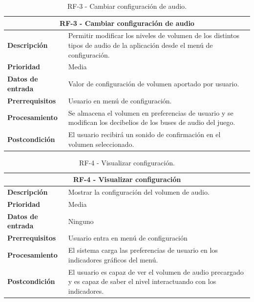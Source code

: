 \begin{table}[H]
	\centering
	\caption{RF-3 - Cambiar configuración de audio.}
	\label{table:RF3}
	\begin{tabular}{|l|p{10cm}|}
		\hline
		\multicolumn{2}{|c|}{\textbf{RF-3 - Cambiar configuración de audio}} \\
		\hline
		\textbf{Descripción} & Permitir modificar los niveles de volumen de los distintos tipos de audio de la aplicación desde el menú de configuración.  \\
		\hline
		\textbf{Prioridad} & Media \\
		\hline
		\textbf{Datos de entrada} & Valor de configuración de volumen aportado por usuario. \\
		\hline
		\textbf{Prerrequisitos} & Usuario en menú de configuración. \\
		\hline
		\textbf{Procesamiento} & Se almacena el volumen en preferencias de usuario y se modifican los decibelios de los buses de audio del juego. \\
		\hline
		\textbf{Postcondición} & El usuario recibirá un sonido de confirmación en el volumen seleccionado. \\
		\hline
	\end{tabular}
	
\end{table}
\begin{table}[H]
	\centering
	\caption{RF-4 - Visualizar configuración.}
	\label{table:RF4}
	\begin{tabular}{|l|p{10cm}|}
		\hline
		\multicolumn{2}{|c|}{\textbf{RF-4 - Visualizar configuración}} \\
		\hline
		\textbf{Descripción} & Mostrar la configuración del volumen de audio.  \\
		\hline
		\textbf{Prioridad} & Media \\
		\hline
		\textbf{Datos de entrada} & Ninguno \\
		\hline
		\textbf{Prerrequisitos} & Usuario entra en menú de configuración \\
		\hline
		\textbf{Procesamiento} & El sistema carga las preferencias de usuario en los indicadores gráficos del menú. \\
		\hline
		\textbf{Postcondición} & El usuario es capaz de ver el volumen de audio precargado y es capaz de saber el nivel interactuando con los indicadores.  \\
		\hline
	\end{tabular}
	
\end{table}
